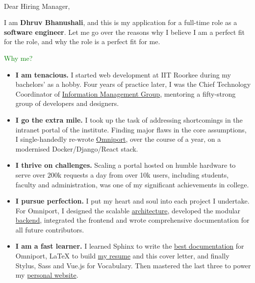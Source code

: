 \begin{multicols}{2}[]
  
  \columnbreak
  \\
\end{multicols}

\setlength{\parskip}{\baselineskip} %
\vspace{-0.5cm}
Dear Hiring Manager,

I am \textbf{Dhruv Bhanushali}, and this is my application for a full-time role
as a \textbf{software engineer}. Let me go over the reasons why I believe I am a
perfect fit for the role, and why the role is a perfect fit for me.

\textcolor{green}{Why me?}
\begin{itemize}[nosep, parsep = 1mm, leftmargin = *]
  \item \textbf{I am tenacious.} I started web development at IIT Roorkee during
  my bachelors' as a hobby. Four years of practice later, I was the Chief
  Technology Coordinator of
  \href{https://https://internet.channeli.in/maintainer_site/}{Information
  Management Group}, mentoring a fifty-strong group of developers and designers.

  \item \textbf{I go the extra mile.} I took up the task of addressing
  shortcomings in the intranet portal of the institute. Finding major flaws in
  the core assumptions, I single-handedly re-wrote
  \href{https://omniport.readthedocs.io}{Omniport}, over the course of a year,
  on a modernised Docker/Django/React stack.

  \item \textbf{I thrive on challenges.} Scaling a portal hosted on humble
  hardware to serve over 200k requests a day from over 10k users, including
  students, faculty and administration, was one of my significant achievements
  in college.

  \item \textbf{I pursue perfection.} I put my heart and soul into each project
  I undertake. For Omniport, I designed the scalable
  \href{https://github.com/IMGIITRoorkee/omniport-docker/}{architecture},
  developed the modular
  \href{https://github.com/IMGIITRoorkee/omniport-backend/}{backend}, integrated
  the frontend and wrote comprehensive documentation for all future
  contributors.

  \item \textbf{I am a fast learner.} I learned Sphinx to write the
  \href{https://github.com/IMGIITRoorkee/omniport-docs/}{best documentation} for
  Omniport, {\selectfont\LaTeX} to build
  \href{https://github.com/dhruvkb/resume/}{my resume} and this cover letter,
  and finally Stylus, Sass and Vue.js for Vocabulary. Then mastered the last
  three to power my \href{https://dhruvkb.github.io/}{personal website}.


\end{itemize}
